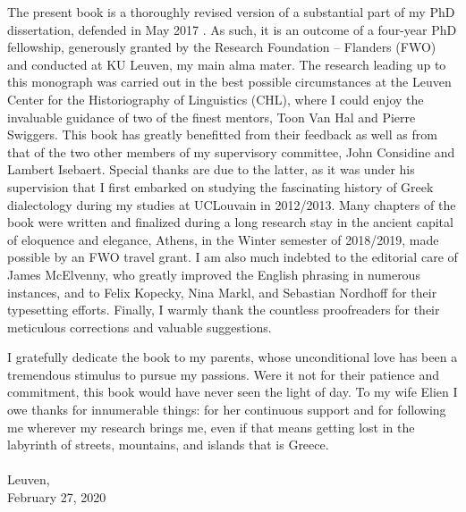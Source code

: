 \addchap{\lsAcknowledgementTitle} 
 
The present book is a thoroughly revised version of a substantial part of my PhD dissertation, defended in May 2017 \parencite{VanRooy2017}. As such, it is an outcome of a four-year PhD fellowship, generously granted by the Research Foundation – Flanders (FWO) and conducted at KU Leuven, my main alma mater. The research leading up to this monograph was carried out in the best possible circumstances at the Leuven Center for the Historiography of Linguistics (CHL), where I could enjoy the invaluable guidance of two of the finest mentors, Toon Van Hal and Pierre Swiggers. This book has greatly benefitted from their feedback as well as from that of the two other members of my supervisory committee, John Considine and Lambert Isebaert. Special thanks are due to the latter, as it was under his supervision that I first embarked on studying the fascinating history of Greek dialectology during my studies at UCLouvain in 2012/2013. Many chapters of the book were written and finalized during a long research stay in the ancient capital of eloquence and elegance, Athens, in the Winter semester of 2018/2019, made possible by an FWO travel grant. I am also much indebted to the editorial care of James McElvenny, who greatly improved the English phrasing in numerous instances, and to Felix Kopecky, Nina Markl, and Sebastian Nordhoff for their typesetting efforts. Finally, I warmly thank the countless proofreaders for their meticulous corrections and valuable suggestions.

I gratefully dedicate the book to my parents, whose unconditional love has been a tremendous
stimulus to pursue my passions. Were it not for their patience and commitment, this book would have
never seen the light of day. To my wife Elien I owe thanks for innumerable things: for her continuous
support and for following me wherever my research brings me, even if that means getting lost in the
labyrinth of streets, mountains, and islands that is Greece.\\\\
Leuven,\\February 27, 2020
